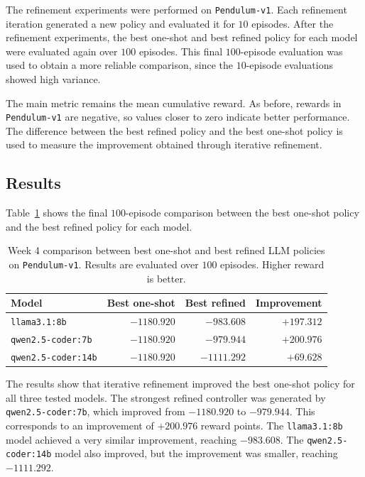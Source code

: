 \documentclass[11pt,a4paper]{article}
\begin{document}
The refinement experiments were performed on \texttt{Pendulum-v1}. Each refinement iteration generated a new policy and evaluated it for $10$ episodes. After the refinement experiments, the best one-shot and best refined policy for each model were evaluated again over $100$ episodes. This final $100$-episode evaluation was used to obtain a more reliable comparison, since the $10$-episode evaluations showed high variance.

The main metric remains the mean cumulative reward. As before, rewards in \texttt{Pendulum-v1} are negative, so values closer to zero indicate better performance. The difference between the best refined policy and the best one-shot policy is used to measure the improvement obtained through iterative refinement.

\subsection{Results}

Table~\ref{tab:week4_refinement_results} shows the final $100$-episode comparison between the best one-shot policy and the best refined policy for each model.

\begin{table}[h]
\centering
\caption{Week 4 comparison between best one-shot and best refined LLM policies on \texttt{Pendulum-v1}. Results are evaluated over $100$ 
episodes. Higher reward is better.}
\label{tab:week4_refinement_results}
\begin{tabular}{|l|r|r|r|}
\hline
Model & Best one-shot & Best refined & Improvement \\
\hline
\texttt{llama3.1:8b} & $-1180.920$ & $-983.608$ & $+197.312$ \\
\texttt{qwen2.5-coder:7b} & $-1180.920$ & $-979.944$ & $+200.976$ \\
\texttt{qwen2.5-coder:14b} & $-1180.920$ & $-1111.292$ & $+69.628$ \\
\hline
\end{tabular}
\end{table}

The results show that iterative refinement improved the best one-shot policy for all three tested models. The strongest refined controller was generated by \texttt{qwen2.5-coder:7b}, which improved from $-1180.920$ to $-979.944$. This corresponds to an improvement of $+200.976$ reward points. The \texttt{llama3.1:8b} model achieved a very similar improvement, reaching $-983.608$. The \texttt{qwen2.5-coder:14b} model also improved, but the improvement was smaller, reaching $-1111.292$.
\end{document}
